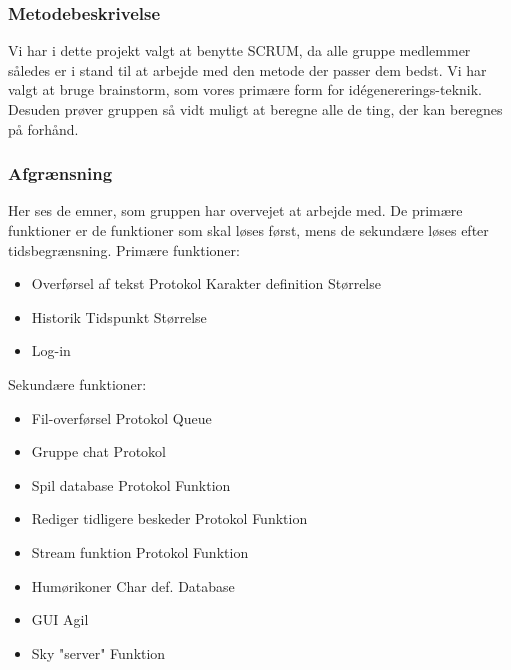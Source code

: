 \subsubsection{Metodebeskrivelse}
Vi har i dette projekt valgt at benytte SCRUM, da alle gruppe medlemmer således er i stand til at arbejde med den metode der passer dem bedst. 
Vi har valgt at bruge brainstorm, som vores primære form for idégenererings-teknik.
Desuden prøver gruppen så vidt muligt at beregne alle de ting, der kan beregnes på forhånd.

\subsubsection{Afgrænsning}
Her ses de emner, som gruppen har overvejet at arbejde med. De primære funktioner er de funktioner som skal løses først, mens de sekundære løses efter tidsbegrænsning.
\newline
Primære funktioner:
\begin{itemize}
	\item Overførsel af tekst
		\subitem Protokol
		\subitem Karakter definition
		\subitem Størrelse
	\item Historik
		\subitem Tidspunkt
		\subitem Størrelse
	\item Log-in
\end{itemize}

Sekundære funktioner:
\begin{itemize}
	\item Fil-overførsel
		\subitem Protokol
		\subitem Queue
	\item Gruppe chat
		\subitem Protokol
	\item Spil database
		\subitem Protokol
		\subitem Funktion
	\item Rediger tidligere beskeder
		\subitem Protokol
		\subitem Funktion
	\item Stream funktion
		\subitem Protokol
		\subitem Funktion
	\item Humørikoner
		\subitem Char def.
		\subitem Database
	\item GUI
		\subitem Agil
	\item Sky "server"
		\subitem Funktion
\end{itemize}